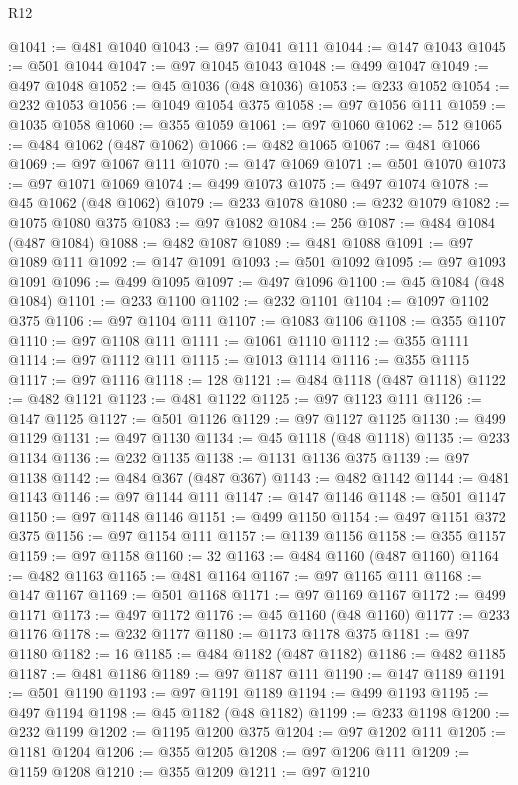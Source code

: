 \begin{lexlean}{R12}
\begin{coremodule}
@1041 := @481 @1040
@1043 := @97 @1041 @111
@1044 := @147 @1043
@1045 := @501 @1044
@1047 := @97 @1045 @1043
@1048 := @499 @1047
@1049 := @497 @1048
@1052 := @45 @1036 (@48 @1036)
@1053 := @233 @1052
@1054 := @232 @1053
@1056 := @1049 @1054 @375
@1058 := @97 @1056 @111
@1059 := @1035 @1058
@1060 := @355 @1059
@1061 := @97 @1060
@1062 := 512
@1065 := @484 @1062 (@487 @1062)
@1066 := @482 @1065
@1067 := @481 @1066
@1069 := @97 @1067 @111
@1070 := @147 @1069
@1071 := @501 @1070
@1073 := @97 @1071 @1069
@1074 := @499 @1073
@1075 := @497 @1074
@1078 := @45 @1062 (@48 @1062)
@1079 := @233 @1078
@1080 := @232 @1079
@1082 := @1075 @1080 @375
@1083 := @97 @1082
@1084 := 256
@1087 := @484 @1084 (@487 @1084)
@1088 := @482 @1087
@1089 := @481 @1088
@1091 := @97 @1089 @111
@1092 := @147 @1091
@1093 := @501 @1092
@1095 := @97 @1093 @1091
@1096 := @499 @1095
@1097 := @497 @1096
@1100 := @45 @1084 (@48 @1084)
@1101 := @233 @1100
@1102 := @232 @1101
@1104 := @1097 @1102 @375
@1106 := @97 @1104 @111
@1107 := @1083 @1106
@1108 := @355 @1107
@1110 := @97 @1108 @111
@1111 := @1061 @1110
@1112 := @355 @1111
@1114 := @97 @1112 @111
@1115 := @1013 @1114
@1116 := @355 @1115
@1117 := @97 @1116
@1118 := 128
@1121 := @484 @1118 (@487 @1118)
@1122 := @482 @1121
@1123 := @481 @1122
@1125 := @97 @1123 @111
@1126 := @147 @1125
@1127 := @501 @1126
@1129 := @97 @1127 @1125
@1130 := @499 @1129
@1131 := @497 @1130
@1134 := @45 @1118 (@48 @1118)
@1135 := @233 @1134
@1136 := @232 @1135
@1138 := @1131 @1136 @375
@1139 := @97 @1138
@1142 := @484 @367 (@487 @367)
@1143 := @482 @1142
@1144 := @481 @1143
@1146 := @97 @1144 @111
@1147 := @147 @1146
@1148 := @501 @1147
@1150 := @97 @1148 @1146
@1151 := @499 @1150
@1154 := @497 @1151 @372 @375
@1156 := @97 @1154 @111
@1157 := @1139 @1156
@1158 := @355 @1157
@1159 := @97 @1158
@1160 := 32
@1163 := @484 @1160 (@487 @1160)
@1164 := @482 @1163
@1165 := @481 @1164
@1167 := @97 @1165 @111
@1168 := @147 @1167
@1169 := @501 @1168
@1171 := @97 @1169 @1167
@1172 := @499 @1171
@1173 := @497 @1172
@1176 := @45 @1160 (@48 @1160)
@1177 := @233 @1176
@1178 := @232 @1177
@1180 := @1173 @1178 @375
@1181 := @97 @1180
@1182 := 16
@1185 := @484 @1182 (@487 @1182)
@1186 := @482 @1185
@1187 := @481 @1186
@1189 := @97 @1187 @111
@1190 := @147 @1189
@1191 := @501 @1190
@1193 := @97 @1191 @1189
@1194 := @499 @1193
@1195 := @497 @1194
@1198 := @45 @1182 (@48 @1182)
@1199 := @233 @1198
@1200 := @232 @1199
@1202 := @1195 @1200 @375
@1204 := @97 @1202 @111
@1205 := @1181 @1204
@1206 := @355 @1205
@1208 := @97 @1206 @111
@1209 := @1159 @1208
@1210 := @355 @1209
@1211 := @97 @1210

\end{coremodule}
\end{lexlean}
